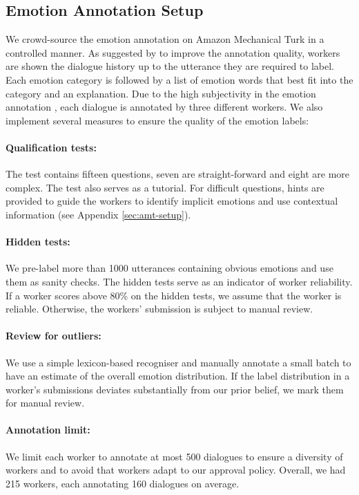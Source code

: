 \documentclass[10pt, a4paper]{article}
\begin{document}
\subsection{Emotion Annotation Setup}
We crowd-source the emotion annotation on Amazon Mechanical Turk in a controlled manner. As suggested by  to improve the annotation quality, workers are shown the dialogue history up to the utterance they are required to label. Each emotion category is followed by a list of emotion words that best fit into the category and an explanation. Due to the high subjectivity in the emotion annotation \cite{Devillers2005ChallengesIR}, each dialogue is annotated by three different workers. We also implement several measures to ensure the quality of the emotion labels:\par

\paragraph{Qualification tests:} The test contains fifteen questions, seven are straight-forward and eight are more complex. The test also serves as a tutorial. For difficult questions, hints are provided to guide the workers to identify implicit emotions and use contextual information (see Appendix \ref{sec:amt-setup}).

\paragraph{Hidden tests:} We pre-label more than 1000 utterances containing obvious emotions and use them as sanity checks. The hidden tests serve as an indicator of worker reliability. If a worker scores above 80\% on the hidden tests, we assume that the worker is reliable. Otherwise, the workers' submission is subject to manual review.

\paragraph{Review for outliers:} We use a simple lexicon-based recogniser and manually annotate a small batch to have an estimate of the overall emotion distribution. If the label distribution in a worker's submissions deviates substantially from our prior belief, we mark them for manual review. 

\paragraph{Annotation limit:} We limit each worker to annotate at most 500 dialogues to ensure a diversity of workers and to avoid that workers adapt to our approval policy. Overall, we had 215 workers, each annotating 160 dialogues on average.
\end{document}
